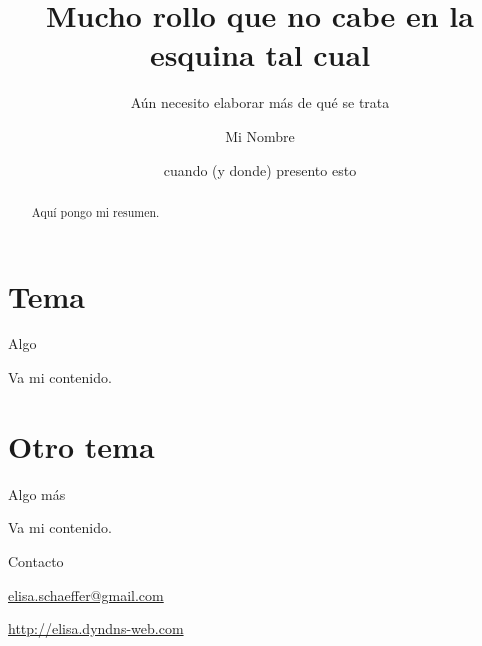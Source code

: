 \documentclass[11pt]{beamer}
\begin{document}
 
\title[Algo breve]{Mucho rollo que no cabe en la esquina tal cual}
\subtitle{Aún necesito elaborar más de qué se trata}
\author{Mi Nombre}
\date{cuando (y donde) presento esto}


\frame{\titlepage}

\begin{frame}
  \begin{abstract}
    Aquí pongo mi resumen.
  \end{abstract}
\end{frame}

\section{Tema}

\begin{frame}{Algo}
  
  Va mi contenido.

\end{frame}

\section{Otro tema}

\begin{frame}{Algo más}
  
  Va mi contenido.

\end{frame}

\begin{frame}{Contacto}

\begin{center}
  
\url{elisa.schaeffer@gmail.com}

\url{http://elisa.dyndns-web.com}

\end{center}

\end{frame}
\end{document}
